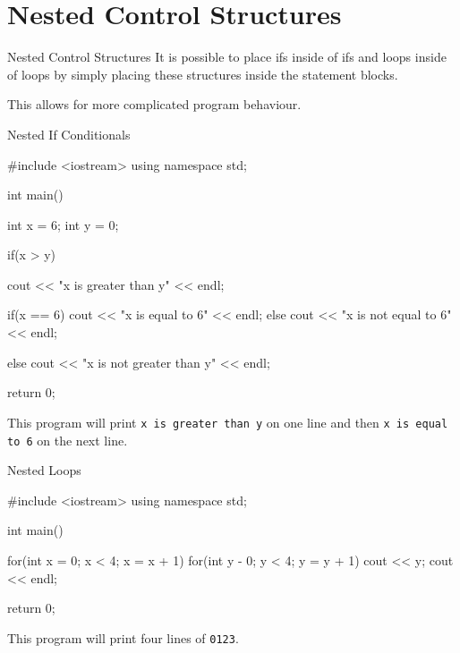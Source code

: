 \documentclass[../lecture3-flowofcontrol.tex]{subfiles}
\begin{document}
\section{Nested Control Structures}


\begin{frame}[fragile]{Nested Control Structures}
    It is possible to place ifs inside of ifs and loops inside of loops by simply placing these structures inside the statement blocks. \newline

    This allows for more complicated program behaviour.
\end{frame}


\begin{frame}[fragile]{Nested If Conditionals}
\begin{cppcode}[]
#include <iostream>
using namespace std;

int main()
{
    int x = 6;
    int y = 0;

    if(x > y)
    {
        cout << "x is greater than y" << endl;

        if(x == 6)
            cout << "x is equal to 6" << endl;
        else
            cout << "x is not equal to 6" << endl;
    }
    else
        cout << "x is not greater than y" << endl;

    return 0;
}
\end{cppcode}

    This program will print \verb|x is greater than y| on one line and then \verb|x is equal to 6| on the next line.
\end{frame}


\begin{frame}[fragile]{Nested Loops}
\begin{cppcode}[]
#include <iostream>
using namespace std;

int main()
{
    for(int x = 0; x < 4; x = x + 1)
    {
        for(int y - 0; y < 4; y = y + 1)
            cout << y;
        cout << endl;
    }

    return 0;
}
\end{cppcode}

    This program will print four lines of \texttt{0123}.
\end{frame}

\end{document}

